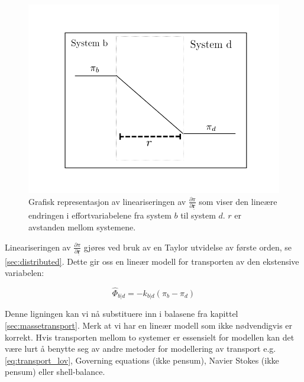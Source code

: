 \begin{figure}[H]
    \centering
    \includegraphics[scale=0.5]{Figures/linearized_transport.png}
    \caption{Grafisk representasjon av lineariseringen av $\frac{\partial \pi}{\partial \underline{\textbf{r}}}$  som viser den lineære endringen i effortvariabelene fra system $b$ til system $d$. $r$ er avstanden mellom systemene. }
    \label{fig:linearized_transport}
\end{figure}
Lineariseringen av $\frac{\partial \pi}{\partial \underline{\textbf{r}}}$ gjøres ved bruk av en Taylor utvidelse av første orden, se \cref{sec:distributed}. Dette gir oss en lineær modell for transporten av den ekstensive variabelen:



\begin{equation}
    \label{eq:transportlov_linear}
    \hat{\Phi}_{b|d} = -k_{b|d}(\pi_b-\pi_d)
\end{equation}

Denne ligningen kan vi nå substituere inn i balasene fra kapittel \cref{sec:massetransport}. Merk at vi har en lineær modell som ikke nødvendigvis er korrekt. Hvis transporten mellom to systemer er essensielt for modellen kan det være lurt å benytte seg av andre metoder for modellering av transport e.g. \cref{eq:transport_lov}, Governing equations (ikke pensum), Navier Stokes (ikke pensum) eller shell-balance. 


